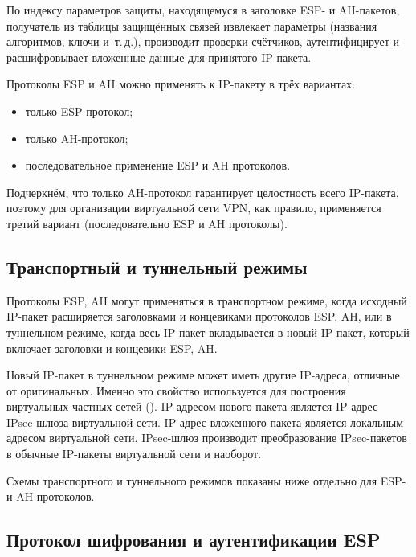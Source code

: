 По индексу параметров защиты, находящемуся в заголовке ESP- и AH-пакетов, получатель из таблицы защищённых связей извлекает параметры (названия алгоритмов, ключи и~т.\,д.), производит проверки счётчиков, аутентифицирует и расшифровывает вложенные данные для принятого IP-пакета.

Протоколы ESP и AH можно применять к IP-пакету в трёх вариантах:
\begin{itemize}
    \item только ESP-протокол;
     \item только AH-протокол;
    \item последовательное применение ESP и AH протоколов.
\end{itemize}
Подчеркнём, что только AH-протокол гарантирует целостность всего IP-пакета, поэтому для организации виртуальной сети VPN, как правило, применяется третий вариант (последовательно ESP и AH протоколы).


\subsection{Транспортный и туннельный режимы}

Протоколы ESP, AH могут применяться в транспортном режиме, когда исходный IP-пакет расширяется заголовками и концевиками протоколов ESP, AH, или в туннельном режиме, когда весь IP-пакет вкладывается в новый IP-пакет, который включает заголовки и концевики ESP, AH.

Новый IP-пакет в туннельном режиме может иметь другие IP-адреса, отличные от оригинальных. Именно это свойство используется для построения виртуальных частных сетей (). IP-адресом нового пакета является IP-адрес IPsec-шлюза виртуальной сети. IP-адрес вложенного пакета является локальным адресом виртуальной сети. IPsec-шлюз производит преобразование IPsec-пакетов в обычные IP-пакеты виртуальной сети и наоборот.

Схемы транспортного и туннельного режимов показаны ниже отдельно для ESP- и AH-протоколов.


\subsection{Протокол шифрования и аутентификации ESP}

